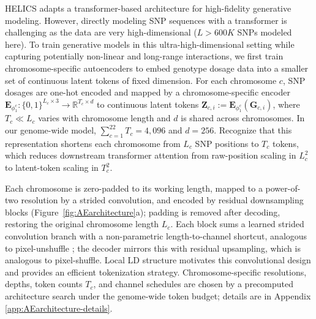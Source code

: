 \documentclass{article}
\begin{document}
HELICS adapts a transformer-based architecture for high-fidelity generative modeling. However, directly modeling SNP sequences with a transformer is challenging as the data are very high-dimensional (\(L>600K\) SNPs modeled here). 
To train generative models in this ultra-high-dimensional setting while capturing potentially non-linear and long-range interactions, we first train chromosome-specific autoencoders to embed genotype dosage data into a smaller set of continuous latent tokens of fixed dimension.
For each chromosome \(c\), SNP dosages are one-hot encoded and mapped by a chromosome-specific encoder \(\mathbf{E}_{\phi_1^c}: \{0,1\}^{L_c\times 3} \rightarrow \mathbb R^{T_c \times d}\) to continuous latent tokens \(\boldsymbol{Z}_{c,i} := \mathbf{E}_{\phi_1^c}(\boldsymbol{G}_{c,i})\), where \(T_c \ll L_c\) varies with chromosome length and \(d\) is shared across chromosomes. In our genome-wide model, \(\sum_{c=1}^{22}T_c = 4{,}096\) and \(d=256\). Recognize that this representation shortens each chromosome from \(L_c\) SNP positions to \(T_c\) tokens, which reduces downstream transformer attention from raw-position scaling in \(L_c^2\) to latent-token scaling in \(T_c^2\).


Each chromosome is zero-padded to its working length, mapped to a power-of-two resolution by a strided convolution, and encoded by residual downsampling blocks (Figure~\ref{fig:AEarchitecture}a); padding is removed after decoding, restoring the original chromosome length $L_c$. Each block sums a learned strided convolution branch with a non-parametric length-to-channel shortcut, analogous to pixel-unshuffle \cite{shi2016real}; the decoder mirrors this with residual upsampling, which is analogous to pixel-shuffle. Local LD structure motivates this convolutional design and provides an efficient tokenization strategy. Chromosome-specific resolutions, depths, token counts \(T_c\), and channel schedules are chosen by a precomputed architecture search under the genome-wide token budget; details are in Appendix \ref{app:AEarchitecture-details}.
\end{document}
